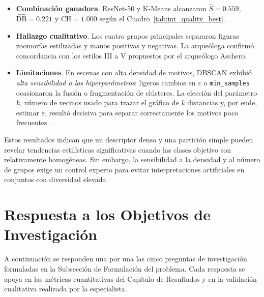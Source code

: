 \begin{itemize}
  \item \textbf{Combinación ganadora}.  ResNet-50 y K-Means alcanzaron
        \(\widehat{S}=0.559\), \(\widehat{\mathrm{DB}}=0.221\)
        y \(\widehat{\mathrm{CH}}=1.000\) según el Cuadro~\ref{tab:int_quality_best}.
  \item \textbf{Hallazgo cualitativo}.  Los cuatro grupos principales
        separaron figuras zoomorfas estilizadas y manos positivas y negativas.
        La arqueóloga confirmó concordancia con los estilos III a V propuestos por el arqueólogo Aschero.
  \item \textbf{Limitaciones}.
        En escenas con alta densidad de motivos, DBSCAN exhibió \emph{alta sensibilidad a los hiperparámetros}: ligeros cambios en \(\varepsilon\) o \texttt{min\_samples} ocasionaron la fusión o fragmentación de clústeres.
        La elección del parámetro \(k\), número de vecinos usado para trazar el gráfico de \(k\) distancias y, por ende, estimar \(\varepsilon\), resultó decisiva para separar correctamente los motivos poco frecuentes.
\end{itemize}

Estos resultados indican que un descriptor denso y una partición simple pueden revelar tendencias estilísticas significativas cuando las clases objetivo son relativamente homogéneas.
Sin embargo, la sensibilidad a la densidad y al número de grupos exige un control experto para evitar interpretaciones artificiales en conjuntos con diversidad elevada.

\section{Respuesta a los Objetivos de Investigación}

A continuación se responden una por una las cinco preguntas de investigación formuladas en la Subsección de Formulación del problema.
Cada respuesta se apoya en las métricas cuantitativas del Capítulo de Resultados y en la validación cualitativa realizada por la especialista.

